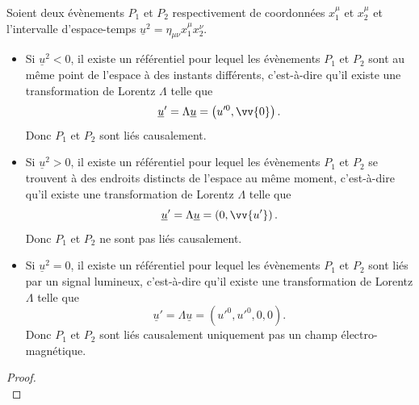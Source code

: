 \documentclass[a4paper,11pt]{report}
\begin{document}
            \begin{prop}\begin{leftbar}
                Soient deux évènements $P_1$ et $P_2$ respectivement de coordonnées $x_1^\mu$ et $x_2^\mu$ et l'intervalle d'espace-temps $\underline{u}^2 = \eta_{\mu\nu}x_1^\mu x_2^\nu$.
                \begin{itemize}[label = \textbullet]
                    \item Si $\underline{u}^2<0$, il existe un référentiel pour lequel les évènements $P_1$ et $P_2$ sont au même point de l'espace à des instants différents, c'est-à-dire qu'il existe une transformation de Lorentz $\Lambda$ telle que
                    \begin{equation}
                        \underline{u}' = \Lambda \underline{u} = \left(u'^0,\vv{0}\right).
                    \end{equation}
                    Donc $P_1$ et $P_2$ sont liés causalement.
                    \item Si $\underline{u}^2>0$, il existe un référentiel pour lequel les évènements $P_1$ et $P_2$ se trouvent à des endroits distincts de l'espace au même moment, c'est-à-dire qu'il existe une transformation de Lorentz $\Lambda$ telle que
                    \begin{equation}
                        \underline{u}' = \Lambda \underline{u} = \left(0,\vv{u'}\right).
                    \end{equation}
                    Donc $P_1$ et $P_2$ ne sont pas liés causalement.
                    \item Si $\underline{u}^2=0$, il existe un référentiel pour lequel les évènements $P_1$ et $P_2$ sont liés par un signal lumineux, c'est-à-dire qu'il existe une transformation de Lorentz $\Lambda$ telle que
                    \begin{equation}
                        \underline{u}' = \Lambda \underline{u} = \left(u'^0,u'^0,0,0\right).
                    \end{equation}
                    Donc $P_1$ et $P_2$ sont liés causalement uniquement pas un champ électro-magnétique.
                \end{itemize}
            \end{leftbar}\end{prop}
            
            \begin{proof}${}$\\
                \comp
            \end{proof}
        
\end{document}
